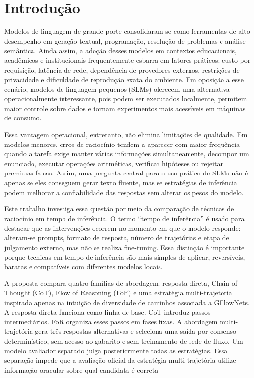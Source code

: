 \documentclass[12pt]{article}
\begin{document}
\section{Introdução}

Modelos de linguagem de grande porte consolidaram-se como ferramentas de alto desempenho em geração textual, programação, resolução de problemas e análise semântica. Ainda assim, a adoção desses modelos em contextos educacionais, acadêmicos e institucionais frequentemente esbarra em fatores práticos: custo por requisição, latência de rede, dependência de provedores externos, restrições de privacidade e dificuldade de reprodução exata do ambiente. Em oposição a esse cenário, modelos de linguagem pequenos (SLMs) oferecem uma alternativa operacionalmente interessante, pois podem ser executados localmente, permitem maior controle sobre dados e tornam experimentos mais acessíveis em máquinas de consumo.

Essa vantagem operacional, entretanto, não elimina limitações de qualidade. Em modelos menores, erros de raciocínio tendem a aparecer com maior frequência quando a tarefa exige manter várias informações simultaneamente, decompor um enunciado, executar operações aritméticas, verificar hipóteses ou rejeitar premissas falsas. Assim, uma pergunta central para o uso prático de SLMs não é apenas se eles conseguem gerar texto fluente, mas se estratégias de inferência podem melhorar a confiabilidade das respostas sem alterar os pesos do modelo.

Este trabalho investiga essa questão por meio da comparação de técnicas de raciocínio em tempo de inferência. O termo ``tempo de inferência'' é usado para destacar que as intervenções ocorrem no momento em que o modelo responde: alteram-se prompts, formato de resposta, número de trajetórias e etapa de julgamento externo, mas não se realiza fine-tuning. Essa distinção é importante porque técnicas em tempo de inferência são mais simples de aplicar, reversíveis, baratas e compatíveis com diferentes modelos locais.

A proposta compara quatro famílias de abordagem: resposta direta, Chain-of-Thought (CoT), Flow of Reasoning (FoR) e uma estratégia multi-trajetória inspirada apenas na intuição de diversidade de caminhos associada a GFlowNets. A resposta direta funciona como linha de base. CoT introduz passos intermediários. FoR organiza esses passos em fases fixas. A abordagem multi-trajetória gera três respostas alternativas e seleciona uma saída por consenso determinístico, sem acesso ao gabarito e sem treinamento de rede de fluxo. Um modelo avaliador separado julga posteriormente todas as estratégias. Essa separação impede que a avaliação oficial da estratégia multi-trajetória utilize informação oracular sobre qual candidata é correta.
\end{document}
